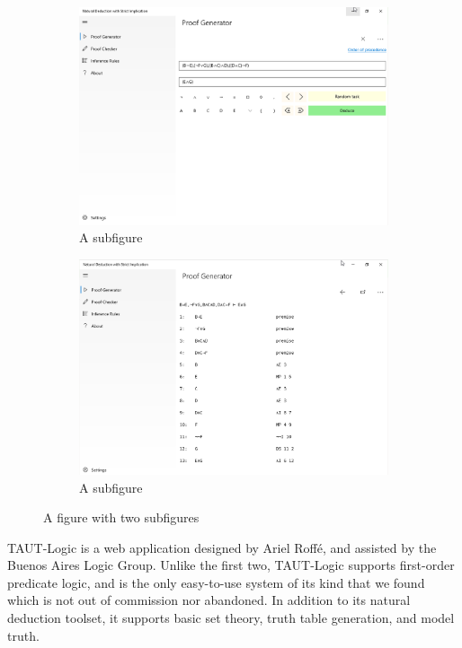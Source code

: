 \documentclass[ms]{uncgdissertationexp2}
\theoremstyle{plain}
\theoremstyle{definition}
\theoremstyle{remark}
\begin{document}
\begin{figure}[h!]
	\centering
	\begin{subfigure}{.5\textwidth}
		\centering
		\includegraphics[width=0.9\linewidth]{w10app-1.png}
		\caption{A subfigure}
		\label{fig:sub1}
	\end{subfigure}%
	\begin{subfigure}{.5\textwidth}
		\centering
		\includegraphics[width=0.9\linewidth]{w10app-2.png}
		\caption{A subfigure}
		\label{fig:sub2}
	\end{subfigure}
	\caption{A figure with two subfigures}
	\label{fig:test}
\end{figure}

TAUT-Logic is a web application designed by Ariel Roff\'e, and assisted by the Buenos Aires Logic Group. Unlike the first two, TAUT-Logic supports first-order predicate logic, and is the only easy-to-use system of its kind that we found which is not out of commission nor abandoned. In addition to its natural deduction toolset, it supports basic set theory,  truth table generation, and model truth. 
\end{document}
